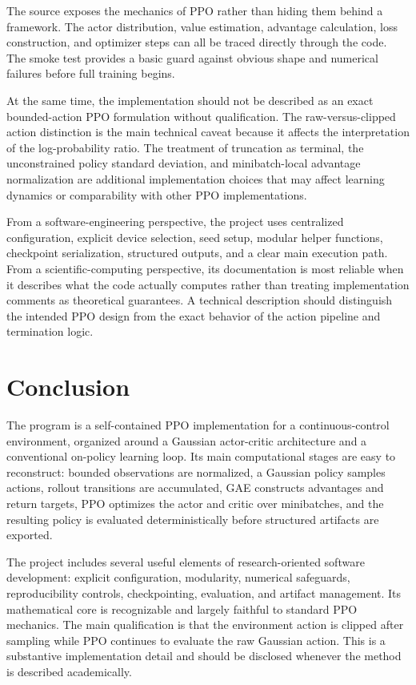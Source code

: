 \documentclass[11pt,a4paper]{article}
\begin{document}
The source exposes the mechanics of PPO rather than hiding them behind a framework. The actor distribution, value estimation, advantage calculation, loss construction, and optimizer steps can all be traced directly through the code. The smoke test provides a basic guard against obvious shape and numerical failures before full training begins.

At the same time, the implementation should not be described as an exact bounded-action PPO formulation without qualification. The raw-versus-clipped action distinction is the main technical caveat because it affects the interpretation of the log-probability ratio. The treatment of truncation as terminal, the unconstrained policy standard deviation, and minibatch-local advantage normalization are additional implementation choices that may affect learning dynamics or comparability with other PPO implementations.

From a software-engineering perspective, the project uses centralized configuration, explicit device selection, seed setup, modular helper functions, checkpoint serialization, structured outputs, and a clear main execution path. From a scientific-computing perspective, its documentation is most reliable when it describes what the code actually computes rather than treating implementation comments as theoretical guarantees. A technical description should distinguish the intended PPO design from the exact behavior of the action pipeline and termination logic.

\section{Conclusion}
The program is a self-contained PPO implementation for a continuous-control environment, organized around a Gaussian actor-critic architecture and a conventional on-policy learning loop. Its main computational stages are easy to reconstruct: bounded observations are normalized, a Gaussian policy samples actions, rollout transitions are accumulated, GAE constructs advantages and return targets, PPO optimizes the actor and critic over minibatches, and the resulting policy is evaluated deterministically before structured artifacts are exported.

The project includes several useful elements of research-oriented software development: explicit configuration, modularity, numerical safeguards, reproducibility controls, checkpointing, evaluation, and artifact management. Its mathematical core is recognizable and largely faithful to standard PPO mechanics. The main qualification is that the environment action is clipped after sampling while PPO continues to evaluate the raw Gaussian action. This is a substantive implementation detail and should be disclosed whenever the method is described academically.
\end{document}
